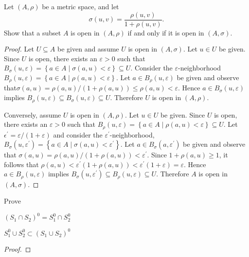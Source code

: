 \documentclass[10pt]{amsart}
\begin{document}
\begin{ex4}{}
  Let $(A,\rho)$ be a metric space, and let 
  $$\sigma(u,v) = \frac{\rho(u,v)}{1 + \rho(u,v)}.$$
  Show that a subset $A$ is open in $(A,\rho)$ if and only if it is open in $(A,\sigma)$.
  
  \begin{proof}
    Let $U \subseteq A$ be given and assume $U$ is open in $(A,\sigma)$.
    Let $u \in U$ be given.
    Since $U$ is open, there exists an $\varepsilon > 0$ such that $B_\sigma(u,\varepsilon) = \left\{a \in A \mid \sigma(a,u) < \varepsilon\right\} \subseteq U$.
    Consider the $\varepsilon$-neighborhood $B_\rho(u,\varepsilon) = \left\{ a \in A \mid \rho(a,u) < \varepsilon\right\}$.
    Let $a \in B_\rho(u,\varepsilon)$ be given and observe that$\sigma(a,u) = \rho(a,u)/(1 + \rho(a,u)) \leq \rho(a,u) < \varepsilon$.
    Hence $a \in B_\sigma(u,\varepsilon)$ implies $B_\rho(u,\varepsilon) \subseteq B_\sigma(u,\varepsilon) \subseteq U$.
    Therefore $U$ is open in $(A,\rho)$.
    
    Conversely, assume $U$ is open in $(A,\rho)$.
    Let $u \in U$ be given.
    Since $U$ is open, there exists an $\varepsilon > 0$ such that $B_\rho(u,\varepsilon) = \left\{a \in A \mid \rho(a,u) < \varepsilon\right\} \subseteq U$.
    Let $\epsilon^{\prime} = \varepsilon/(1 + \varepsilon)$ and consider the $\varepsilon^{\prime}$-neighborhood, $B_\sigma(u, \varepsilon^{\prime}) = \left\{a \in A \mid \sigma(a,u) < \varepsilon^{\prime} \right\}$.
    Let $a \in B_\sigma(a,\varepsilon^{\prime})$ be given and observe that $\sigma(a,u) = \rho(a,u)/(1 + \rho(a,u)) < \varepsilon^{\prime}$.
    Since $1 + \rho(a,u) \geq 1$, it follows that $\rho(a,u) < \varepsilon^{\prime}(1 + \rho(a,u)) < \varepsilon^{\prime}(1 + \varepsilon) = \varepsilon$.
    Hence $a \in B_\rho(u,\varepsilon)$ implies $B_\sigma(u,\varepsilon^{\prime}) \subseteq B_\rho(u,\varepsilon) \subseteq U$.
    Therefore $A$ is open in $(A,\sigma)$.
  \end{proof}
\end{ex4}{}

\begin{ex13}{}
  Prove\\
  \begin{inparaenum}[(a)]
  \item\label{13a}
    $(S_1 \cap S_2)^0 = S_1^0 \cap S_2^0$\hspace{10mm}
  \item\label{13b}
    $S_1^0 \cup S_2^0 \subset (S_1 \cup S_2)^0$
  \end{inparaenum}
  
  \begin{proof}
  \end{proof}
\end{ex13}{}
\end{document}
